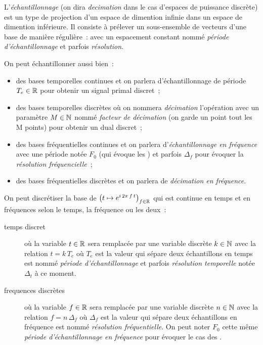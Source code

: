 \begin{definition}
  L'\emph{échantillonnage} (on dira \emph{decimation} dans le cas
  d'espaces de puissance discrète) est un type de projection d'un
  espace de dimention infinie dans un espace de dimention
  inférieure. Il consiste à prélever un sous-ensemble de vecteurs
  d'une base de manière régulière~: avec un espacement constant nommé
  \emph{période d'échantillonnage} et parfois \emph{résolution}.
\end{definition}

\begin{remarque}
  On peut échantillonner aussi bien~:
  \begin{itemize}
  \item des bases temporelles continues et on parlera
    d'échantillonnage de période $T_e\in\mathbb{R}$ pour obtenir un signal
    primal discret~;
  \item des bases temporelles discrètes où on nommera
    \emph{décimation} l'opération avec un paramètre $M\in\mathbb{N}$ nommé
    \emph{facteur de décimation} (on garde un point tout les M points)
    pour obtenir un dual discret~;
  \item des bases fréquentielles continues et on parlera
    d'\emph{échantillonnage en fréquence} avec une période notée $F_0$
    (qui évoque les \sdf) et parfois $\Delta_f$ pour évoquer la
    \emph{résolution fréquencielle}~;
  \item des bases fréquentielles discrètes et on parlera de
    \emph{décimation en fréquence}.
  \end{itemize}
\end{remarque}

On peut discrétiser la base de \Fourier{}
$\left(t\mapsto e^{i\,2\pi\,f\,t}\right)_{f\in\mathbb{R}}$ qui est continue en temps et
en fréquences selon le temps, la fréquence ou les deux~:
\begin{description}
\item[temps discret] où la variable $t\in\mathbb{R}$ sera remplacée par une
  variable discrète $k\in\mathbb{N}$ avec la relation $t=k\,T_e$ où $T_e$ est
  la valeur qui sépare deux échantillons en temps est nommé
  \emph{période d'échantillonnage} et parfois \emph{résolution
    temporelle} notée $\Delta_t$ à ce moment.
\item[frequences discrètes] où la variable $f\in\mathbb{R}$ sera remplacée par
  une variable discrète $n\in\mathbb{N}$ avec la relation $f=n\,\Delta_f$ où
  $\Delta_f$ est la valeur qui sépare deux échantillons en fréquence
  est nommé \emph{résolution fréquentielle}. On peut noter $F_0$ cette
  même \emph{période d'échantillonnage en fréquence} pour évoquer le
  cas des \sdf.
\end{description}

